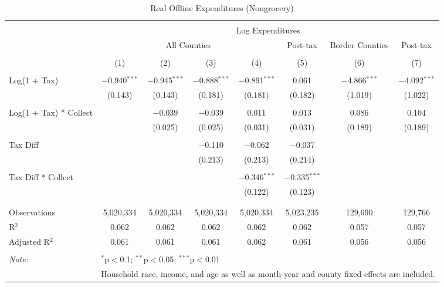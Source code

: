 
\begin{table}[!htbp] \centering 
  \caption{Real Offline Expenditures (Nongrocery)} 
  \label{} 
\begin{tabular}{@{\extracolsep{5pt}}lccccccc} 
\\[-1.8ex]\hline 
\hline \\[-1.8ex] 
 & \multicolumn{7}{c}{Log Expenditures} \\ 
\cline{2-8} 
 & \multicolumn{4}{c}{All Counties} & Post-tax & Border Counties & Post-tax \\ 
\\[-1.8ex] & (1) & (2) & (3) & (4) & (5) & (6) & (7)\\ 
\hline \\[-1.8ex] 
 Log(1 + Tax) & $-$0.940$^{***}$ & $-$0.945$^{***}$ & $-$0.888$^{***}$ & $-$0.891$^{***}$ & 0.061 & $-$4.866$^{***}$ & $-$4.092$^{***}$ \\ 
  & (0.143) & (0.143) & (0.181) & (0.181) & (0.182) & (1.019) & (1.022) \\ 
  & & & & & & & \\ 
 Log(1 + Tax) * Collect &  & $-$0.039 & $-$0.039 & 0.011 & 0.013 & 0.086 & 0.104 \\ 
  &  & (0.025) & (0.025) & (0.031) & (0.031) & (0.189) & (0.189) \\ 
  & & & & & & & \\ 
 Tax Diff &  &  & $-$0.110 & $-$0.062 & $-$0.037 &  &  \\ 
  &  &  & (0.213) & (0.213) & (0.214) &  &  \\ 
  & & & & & & & \\ 
 Tax Diff * Collect &  &  &  & $-$0.346$^{***}$ & $-$0.335$^{***}$ &  &  \\ 
  &  &  &  & (0.122) & (0.123) &  &  \\ 
  & & & & & & & \\ 
\hline \\[-1.8ex] 
Observations & 5,020,334 & 5,020,334 & 5,020,334 & 5,020,334 & 5,023,235 & 129,690 & 129,766 \\ 
R$^{2}$ & 0.062 & 0.062 & 0.062 & 0.062 & 0.062 & 0.057 & 0.057 \\ 
Adjusted R$^{2}$ & 0.061 & 0.061 & 0.061 & 0.062 & 0.061 & 0.056 & 0.056 \\ 
\hline 
\hline \\[-1.8ex] 
\textit{Note:}  & \multicolumn{7}{l}{$^{*}$p$<$0.1; $^{**}$p$<$0.05; $^{***}$p$<$0.01} \\ 
 & \multicolumn{7}{l}{Household race, income, and age as well as month-year and county fixed effects are included.} \\ 
\end{tabular} 
\end{table} 

